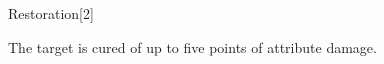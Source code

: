 \begin{spellsection}[Lesser]{Restoration}[2]
    \begin{spellheader}
    \end{spellheader}
    \begin{spellcontent}
        \begin{spelltargetinginfo}
        \end{spelltargetinginfo}
        \begin{spelleffects}

            \spelleffect The target is cured of up to five points of attribute damage.
        \end{spelleffects}
    \end{spellcontent}
    \begin{spellfooter}
    \end{spellfooter}
\end{spellsection}

